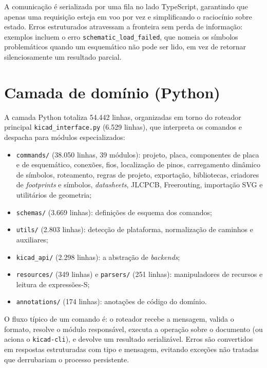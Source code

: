 A comunicação é serializada por uma fila no lado TypeScript, garantindo que
apenas uma requisição esteja em voo por vez e simplificando o raciocínio
sobre estado. Erros estruturados atravessam a fronteira sem perda de
informação: exemplos incluem o erro \texttt{schematic\_load\_failed}, que
nomeia os símbolos problemáticos quando um esquemático não pode ser lido, em
vez de retornar silenciosamente um resultado parcial.

\section{Camada de domínio (Python)}

A camada Python totaliza 54.442 linhas, organizadas em torno do roteador
principal \texttt{kicad\_interface.py} (6.529 linhas), que interpreta os
comandos e despacha para módulos especializados:

\begin{itemize}[leftmargin=1.4em,itemsep=0.2em]
  \item \texttt{commands/} (38.050 linhas, 39 módulos): projeto, placa,
        componentes de placa e de esquemático, conexões, fios, localização de
        pinos, carregamento dinâmico de símbolos, roteamento, regras de
        projeto, exportação, bibliotecas, criadores de \emph{footprints} e
        símbolos, \emph{datasheets}, JLCPCB, Freerouting, importação SVG e
        utilitários de geometria;
  \item \texttt{schemas/} (3.669 linhas): definições de esquema dos comandos;
  \item \texttt{utils/} (2.803 linhas): detecção de plataforma, normalização
        de caminhos e auxiliares;
  \item \texttt{kicad\_api/} (2.298 linhas): a abstração de \emph{backends};
  \item \texttt{resources/} (349 linhas) e \texttt{parsers/} (251 linhas):
        manipuladores de recursos e leitura de expressões-S;
  \item \texttt{annotations/} (174 linhas): anotações de código do domínio.
\end{itemize}

O fluxo típico de um comando é: o roteador recebe a mensagem, valida o
formato, resolve o módulo responsável, executa a operação sobre o documento
(ou aciona o \texttt{kicad-cli}), e devolve um resultado serializável. Erros
são convertidos em respostas estruturadas com tipo e mensagem, evitando
exceções não tratadas que derrubariam o processo persistente.

